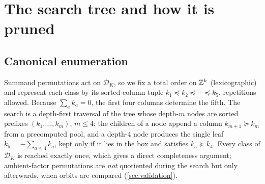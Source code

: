 \section{The search tree and how it is pruned}
\label{sec:search}

\subsection{Canonical enumeration}

Summand permutations act on $\mathcal D_K$, so we fix a total order on $\mathbb{Z}^h$
(lexicographic) and represent each class by its sorted column tuple
$k_1\preceq k_2\preceq\cdots\preceq k_5$, repetitions allowed. Because
$\sum_ak_a=0$, the first four columns determine the fifth. The search is a
depth-first traversal of the tree whose depth-$m$ nodes are sorted prefixes
$(k_1,\dots,k_m)$, $m\le4$; the children of a node append a column
$k_{m+1}\succeq k_m$ from a precomputed pool, and a depth-4 node produces the
single leaf $k_5=-\sum_{a\le4}k_a$, kept only if it lies in the box and satisfies
$k_5\succeq k_4$. Every class of $\mathcal D_K$ is reached exactly once, which
gives a direct completeness argument; ambient-factor permutations are
\emph{not} quotiented during the search but only afterwards, when orbits are
compared (\cref{sec:validation}).

